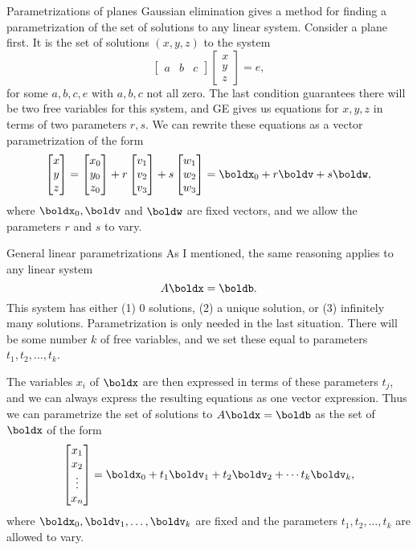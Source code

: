 \begin{frame}{Parametrizations of planes}
\footnotesize 
Gaussian elimination gives a method for finding a parametrization of the set of solutions to any linear system. 
\bpause 
Consider a plane first. It is the set of solutions $(x,y,z)$ to the system 
\[
\begin{bmatrix}a&b&c\end{bmatrix}\begin{bmatrix}x\\ y\\ z\end{bmatrix}=e,
\] 
for some $a, b, c, e$ with $a, b, c$ not all zero. 
\bpause The last condition guarantees there will be two free variables for this system, and GE gives us equations for $x,y,z$ in terms of two parameters $r, s$.
\bpause We can rewrite these equations as a vector parametrization of the form 
\[
\begin{bmatrix}x\\ y\\ z\end{bmatrix}=\begin{bmatrix}x_0\\ y_0\\ z_0\end{bmatrix}+r\begin{bmatrix}v_1\\ v_2\\ v_3\end{bmatrix}+s\begin{bmatrix}w_1\\ w_2\\ w_3\end{bmatrix}=\boldx_0+r\boldv+s\boldw,
\]
where $\boldx_0, \boldv$ and $\boldw$ are fixed vectors, and we allow the parameters $r$ and $s$ to vary. 

\end{frame}
\begin{frame}{General linear parametrizations}
\footnotesize
As I mentioned, the same reasoning applies to any linear system
\[
A\boldx=\boldb.
\]
This system has either (1) 0 solutions, (2) a unique solution, or (3) infinitely many solutions. 
\bpause
Parametrization is only needed in the last situation. There will be some number $k$ of free variables, and we set these equal to parameters $t_1,t_2,\dots ,t_k$.  

\bpause The variables $x_i$ of $\boldx$ are then expressed in terms of these parameters $t_j$, and we can always express the resulting equations as one vector expression. 
\bpause 
Thus we can parametrize the set of solutions to $A\boldx=\boldb$ as the set of $\boldx$ of the form 
\[
\begin{bmatrix}x_1\\ x_2 \\ \vdots \\ x_n\end{bmatrix}=\boldx_0+t_1\boldv_1+t_2\boldv_2+\cdots t_k\boldv_k,
\]
where $\boldx_0,\boldv_1,\dots, \boldv_k$ are fixed and the parameters $t_1,t_2,\dots, t_k$ are allowed to vary. 

\end{frame}